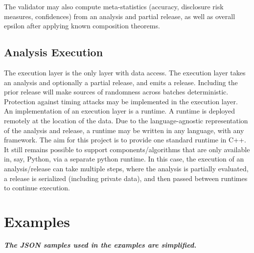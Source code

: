 \documentclass[11pt]{article}
\begin{document}
The validator may also compute meta-statistics (accuracy, disclosure risk measures, confidences) from an analysis and partial release, as well as overall epsilon after applying known composition theorems.

\subsection{Analysis Execution}
The execution layer is the only layer with data access. The execution layer takes an analysis and optionally a partial release, and emits a release. Including the prior release will make sources of randomness across batches deterministic. Protection against timing attacks may be implemented in the execution layer. \\

An implementation of an execution layer is a runtime. A runtime is deployed remotely at the location of the data. Due to the language-agnostic representation of the analysis and release, a runtime may be written in any language, with any framework. The aim for this project is to provide one standard runtime in C++. It still remains possible to support components/algorithms that are only available in, say, Python, via a separate python runtime. In this case, the execution of an analysis/release can take multiple steps, where the analysis is partially evaluated, a release is serialized (including private data), and then passed between runtimes to continue execution.


\section{Examples}
\textbf{\textit{The JSON samples used in the examples are simplified.}} 
\end{document}
